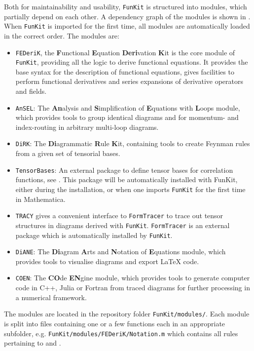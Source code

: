 \documentclass[preprint,10pt,sort&compress]{elsarticle}
\newcommand{\mathem}{\mmaInlineCell{Code}}
\newcommand{\FunKit}{\texttt{FunKit}\xspace}
\newcommand{\FEDeriK}{\texttt{FEDeriK}\xspace}
\newcommand{\DiRK}{\texttt{DiRK}\xspace}
\newcommand{\DiANE}{\texttt{DiANE}\xspace}
\newcommand{\TRACY}{\texttt{TRACY}\xspace}
\newcommand{\AnSEL}{\texttt{AnSEL}\xspace}
\newcommand{\COEN}{\texttt{COEN}\xspace}
\newcommand{\TensorBases}{\texttt{TensorBases}\xspace}
\newcommand{\FormTracer}{\texttt{FormTracer}\xspace}
\begin{document}
Both for maintainability and usability, \FunKit is structured into modules, which partially depend on each other. A dependency graph of the modules is shown in . 
When \FunKit is imported for the first time, all modules are automatically loaded in the correct order. The modules are:
%
\begin{itemize}
	\item \FEDeriK, the {\textbf{F}unctional \textbf{E}quation \textbf{Deri}vation \textbf{K}it} is the core module of \FunKit, providing all the logic to derive functional equations. It provides the base syntax for the description of functional equations, gives facilities to perform functional derivatives and series expansions of derivative operators and fields.
	\item \AnSEL: The \textbf{An}alysis and \textbf{S}implification of \textbf{E}quations with \textbf{L}oops module, which provides tools to group identical diagrams and for momentum- and index-routing in arbitrary multi-loop diagrams.
	\item \DiRK: The \textbf{Di}agrammatic \textbf{R}ule \textbf{K}it, containing tools to create Feynman rules from a given set of tensorial bases.
	\item \TensorBases: An external package to define tensor bases for correlation functions, see \cite{Braun:2025gvq}. This package will be automatically installed with FunKit, either during the installation, or when one imports \FunKit for the first time in Mathematica.
	\item \TRACY gives a convenient interface to \FormTracer \cite{Cyrol:2016zqb} to trace out tensor structures in diagrams derived with \FunKit. \FormTracer is an external package which is automatically installed by \FunKit.
	\item \DiANE: The \textbf{Di}agram \textbf{A}rts and \textbf{N}otation of \textbf{E}quations module, which provides tools to visualise diagrams and export \LaTeX{} code.
	\item \COEN: The \textbf{CO}de \textbf{EN}gine module, which provides tools to generate computer code in C++, Julia or Fortran from traced diagrams for further processing in a numerical framework.
\end{itemize}
%
The modules are located in the repository folder \texttt{FunKit/modules/}.
Each module is split into files containing one or a few functions each in an appropriate subfolder, e.g. \texttt{FunKit/modules/FEDeriK/Notation.m} which contains all rules pertaining to \mathem{\mmaDef{FTerm}} and \mathem{\mmaDef{FEx}}.
\end{document}
